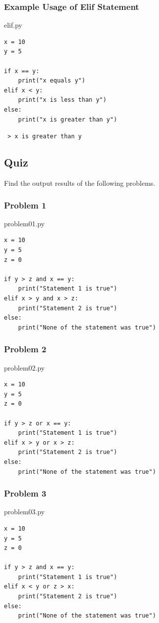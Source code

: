 \documentclass{report}
\begin{document}
\subsubsection*{Example Usage of Elif Statement}
\begin{vscode}{elif.py}
\begin{lstlisting}[style=vscodeStyle]
x = 10
y = 5

if x == y:
    print("x equals y")
elif x < y:
    print("x is less than y")
else:
    print("x is greater than y")
\end{lstlisting}
\end{vscode}

\begin{terminal}
\texttt{\color{terminalFont} > x is greater than y }\\
\end{terminal}

\subsection*{Quiz}
Find the output results of the following problems.
\subsubsection*{Problem 1}
\begin{vscode}{problem01.py}
\begin{lstlisting}[style=vscodeStyle]
x = 10
y = 5
z = 0

if y > z and x == y:
    print("Statement 1 is true")
elif x > y and x > z:
    print("Statement 2 is true")
else:
    print("None of the statement was true")
\end{lstlisting}
\end{vscode}

\subsubsection*{Problem 2}
\begin{vscode}{problem02.py}
\begin{lstlisting}[style=vscodeStyle]
x = 10
y = 5
z = 0

if y > z or x == y:
    print("Statement 1 is true")
elif x > y or x > z:
    print("Statement 2 is true")
else:
    print("None of the statement was true")
\end{lstlisting}
\end{vscode}

\subsubsection*{Problem 3}
\begin{vscode}{problem03.py}
\begin{lstlisting}[style=vscodeStyle]
x = 10
y = 5
z = 0

if y > z and x == y:
    print("Statement 1 is true")
elif x < y or z > x:
    print("Statement 2 is true")
else:
    print("None of the statement was true")
\end{lstlisting}
\end{vscode}
\end{document}
